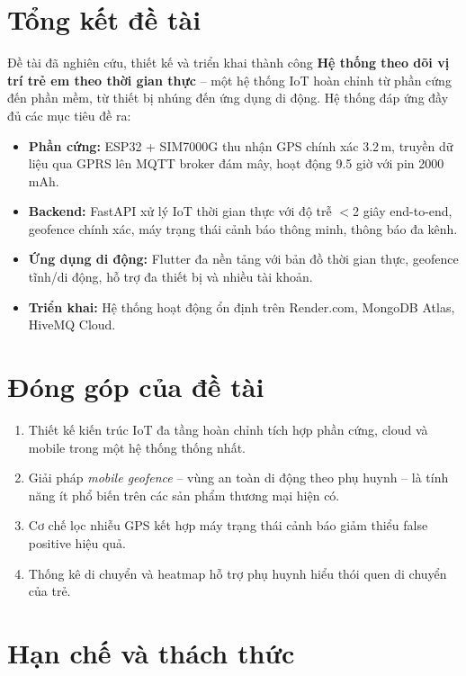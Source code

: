 \documentclass[13pt, a4paper]{report}
\newcommand{\systemname}{Hệ thống theo dõi vị trí trẻ em theo thời gian thực}
\begin{document}
\section{Tổng kết đề tài}

Đề tài đã nghiên cứu, thiết kế và triển khai thành công \textbf{\systemname{}} -- một hệ thống IoT hoàn chỉnh từ phần cứng đến phần mềm, từ thiết bị nhúng đến ứng dụng di động. Hệ thống đáp ứng đầy đủ các mục tiêu đề ra:

\begin{itemize}
  \item \textbf{Phần cứng:} ESP32 + SIM7000G thu nhận GPS chính xác 3.2\,m, truyền dữ liệu qua GPRS lên MQTT broker đám mây, hoạt động 9.5 giờ với pin 2000\,mAh.
  \item \textbf{Backend:} FastAPI xử lý IoT thời gian thực với độ trễ $<$2 giây end-to-end, geofence chính xác, máy trạng thái cảnh báo thông minh, thông báo đa kênh.
  \item \textbf{Ứng dụng di động:} Flutter đa nền tảng với bản đồ thời gian thực, geofence tĩnh/di động, hỗ trợ đa thiết bị và nhiều tài khoản.
  \item \textbf{Triển khai:} Hệ thống hoạt động ổn định trên Render.com, MongoDB Atlas, HiveMQ Cloud.
\end{itemize}

\section{Đóng góp của đề tài}

\begin{enumerate}
  \item Thiết kế kiến trúc IoT đa tầng hoàn chỉnh tích hợp phần cứng, cloud và mobile trong một hệ thống thống nhất.
  \item Giải pháp \textit{mobile geofence} -- vùng an toàn di động theo phụ huynh -- là tính năng ít phổ biến trên các sản phẩm thương mại hiện có.
  \item Cơ chế lọc nhiễu GPS kết hợp máy trạng thái cảnh báo giảm thiểu false positive hiệu quả.
  \item Thống kê di chuyển và heatmap hỗ trợ phụ huynh hiểu thói quen di chuyển của trẻ.
\end{enumerate}

\section{Hạn chế và thách thức}
\end{document}
